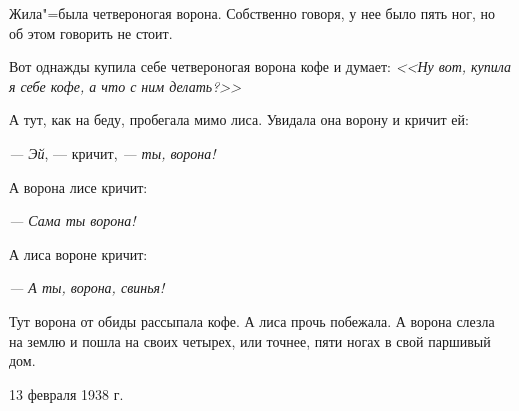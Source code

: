 Жила"=была четвероногая ворона. Собственно говоря, у нее было пять ног, но об этом говорить не стоит.

Вот однажды купила себе четвероногая ворона кофе и думает: \textit{<<Ну вот, купила я себе кофе, а что с ним делать?>>}

А тут, как на беду, пробегала мимо лиса. Увидала она ворону и кричит ей:

\textit{--- Эй}, --- кричит, \textit{--- ты, ворона!}

А ворона лисе кричит:

\textit{--- Сама ты ворона!}

А лиса вороне кричит:

\textit{--- А ты, ворона, свинья!}

Тут ворона от обиды рассыпала кофе. А лиса прочь побежала. А ворона слезла на землю и пошла на своих четырех, или точнее, пяти ногах в свой паршивый дом.

\begin{flushright}
13 февраля 1938 г.
\end{flushright}